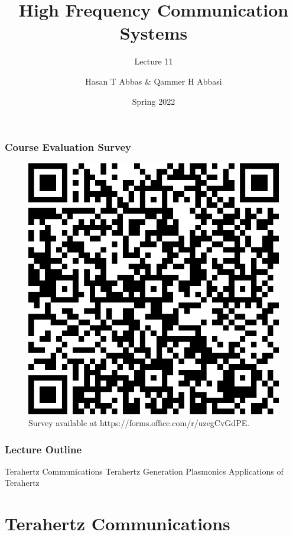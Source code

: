 \documentclass[10pt]{beamer}
\title{High Frequency Communication Systems}
\subtitle{Lecture 11}
\date{Spring 2022}
\author{Hasan T Abbas \& Qammer H Abbasi}
\begin{document}
\maketitle


\begin{frame}
    \frametitle{Course Evaluation Survey}

    \begin{figure}[h!]
        \centering
        \includegraphics[width=.5\textwidth]{QRCode for High-Frequency Communication Systems.png}
        \caption{Survey available at https://forms.office.com/r/uzegCvGdPE.}
    \end{figure}
\end{frame}

\begin{frame}[fragile]
    \frametitle{Lecture Outline}
    \begin{outline}[itemize]
        \1 Terahertz Communications
        \1 Terahertz Generation
        \1 Plasmonics
        \1 Applications of Terahertz
    \end{outline}
\end{frame}

\section{Terahertz Communications}
\end{document}
